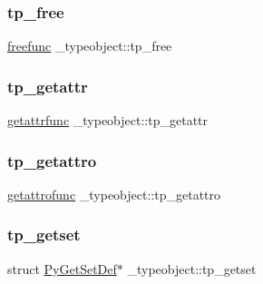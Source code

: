 \subsubsection{\texorpdfstring{tp\_free}{tp\_free}}
{\footnotesize\ttfamily \mbox{\hyperlink{_python27_2object_8h_a4422b04dcad738e4b4e7a2df5e15dd26}{freefunc}} \+\_\+typeobject\+::tp\+\_\+free}

\mbox{\label{struct__typeobject_a08abee6f5a4acecaf660eebadd013d09}} 
\subsubsection{\texorpdfstring{tp\_getattr}{tp\_getattr}}
{\footnotesize\ttfamily \mbox{\hyperlink{_python27_2object_8h_afe85498fb57ac8736e9e6a064f839445}{getattrfunc}} \+\_\+typeobject\+::tp\+\_\+getattr}

\mbox{\label{struct__typeobject_af952b31f626d02e7e1cbe7d806ea2131}} 
\subsubsection{\texorpdfstring{tp\_getattro}{tp\_getattro}}
{\footnotesize\ttfamily \mbox{\hyperlink{_python27_2object_8h_ae44e29e13b2c19e82e033c0a2faf9f9d}{getattrofunc}} \+\_\+typeobject\+::tp\+\_\+getattro}

\mbox{\label{struct__typeobject_ad57015f55cd9be5bb1b44d7bd9707bc6}} 
\subsubsection{\texorpdfstring{tp\_getset}{tp\_getset}}
{\footnotesize\ttfamily struct \mbox{\hyperlink{struct_py_get_set_def}{Py\+Get\+Set\+Def}}$\ast$ \+\_\+typeobject\+::tp\+\_\+getset}

\mbox{\label{struct__typeobject_a0264db6fd772b4c0968c4e71ca1a62a9}} 
